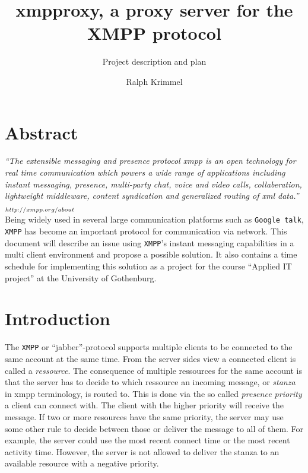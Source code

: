 \documentclass[a4paper,10pt,numbers=noendperiod]{scrartcl}
\author{Ralph Krimmel}
\title{xmpproxy, a proxy server for the XMPP protocol}
\subtitle{ Project description and plan }
\begin{document}
\maketitle{}
\thispagestyle{empty}
\newpage
\tableofcontents{}
\newpage

\section{Abstract}
\textit{``The extensible messaging and presence protocol xmpp is an open technology 
for real time communication which powers a wide range of applications including instant messaging, 
presence, multi-party chat, voice and video calls, collaberation, lightweight middleware, 
content syndication and generalized routing of xml data.''}   $_{\tiny http://xmpp.org/about}$ \\

Being widely used in several large communication platforms such as \texttt{Google talk},  %
\texttt{XMPP} has become an important protocol for communication via network. This document will describe an 
issue using \texttt{XMPP}'s instant messaging capabilities in a multi client environment and propose a possible solution.
It also contains a time schedule for implementing this solution as a project for the course ``Applied IT project'' at the University 
of Gothenburg.

\section{Introduction}
The \texttt{XMPP} or ``jabber''-protocol supports multiple clients to be connected to the same account at the same time. From the server sides view a connected client is called a \textit{ressource}. The consequence of multiple ressources for the same account is that the server has to decide to which ressource an incoming message, or \textit{stanza} in xmpp terminology, is routed to. This is done via the so called \textit{presence priority} a client can connect with.  The client with the higher priority will receive the message. 
If two or more resources have the same priority, the server may use some other rule to decide between those or deliver the message to all of them. For example, the server could use the most recent connect time or the most recent activity time. However, the server is not allowed to deliver the stanza to an available resource with a negative priority. %
\end{document}
